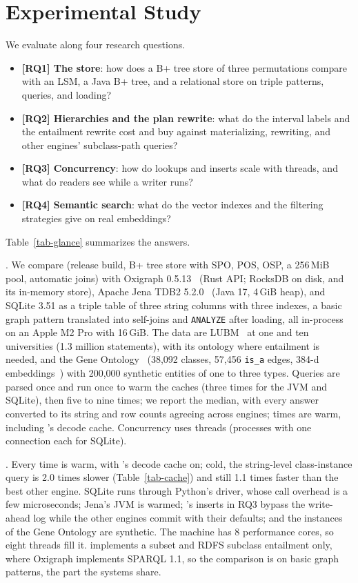 \section{Experimental Study}
\label{sec-exp}

We evaluate \sys along four research questions.
\begin{itemize}
\item \textbf{[RQ1] The store}: how does a B+ tree store of three permutations
  compare with an LSM, a Java B+ tree, and a relational store on triple
  patterns, queries, and loading?
\item \textbf{[RQ2] Hierarchies and the plan rewrite}: what do the interval labels
  and the entailment rewrite cost and buy against materializing, rewriting, and
  other engines' subclass-path queries?
\item \textbf{[RQ3] Concurrency}: how do lookups and inserts scale with
  threads, and what do readers see while a writer runs?
\item \textbf{[RQ4] Semantic search}: what do the vector indexes and the
  filtering strategies give on real embeddings?
\end{itemize}
Table~\ref{tab-glance} summarizes the answers.



.
We compare \sys (release build, B+ tree store with SPO, POS, OSP, a 256\,MiB
pool, automatic joins) with Oxigraph 0.5.13~\cite{oxigraph} (Rust API; RocksDB
on disk, and its in-memory store), Apache Jena TDB2 5.2.0~\cite{jenatdb} (Java
17, 4\,GiB heap), and SQLite 3.51 as a triple table of three string columns with
three indexes, a basic graph pattern translated into self-joins and
\texttt{ANALYZE} after loading, all in-process on an Apple M2 Pro with 16\,GiB.
The data are LUBM~\cite{lubm} at one and ten universities (1.3 million
statements), with its ontology where entailment is needed, and the Gene
Ontology~\cite{ashburner2000} (38,092 classes, 57,456 \texttt{is\_a} edges, 384-d
embeddings~\cite{reimers2019}) with 200,000 synthetic entities of one to three
types.
Queries are parsed once and run once to warm the caches (three times for the JVM
and SQLite), then five to nine times; we report the median, with every answer
converted to its string and row counts agreeing across engines; times are warm,
including \sys's decode cache.
Concurrency uses threads (processes with one connection each for SQLite).

.
Every time is warm, with \sys's decode cache on; cold, the string-level class-instance
query is 2.0 times slower (Table~\ref{tab-cache}) and still 1.1 times faster than the best
other engine.
SQLite runs through Python's driver, whose call overhead is a few microseconds;
Jena's JVM is warmed; \sys's inserts in RQ3 bypass the write-ahead log while the other
engines commit with their defaults; and the instances of the Gene Ontology are
synthetic.
The machine has 8 performance cores, so eight threads fill it.
\sys implements a \sparql subset and RDFS subclass entailment only, where Oxigraph
implements SPARQL 1.1, so the comparison is on basic graph patterns, the part the
systems share.

